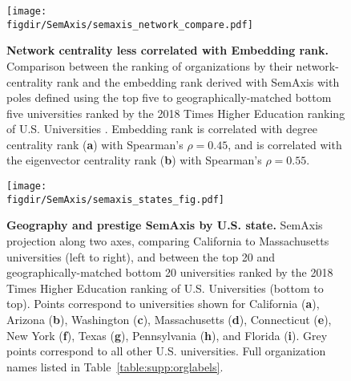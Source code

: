 \documentclass[12pt]{article} %
\def\figdir{../Figs}
\begin{document}
%
%
\begin{figure}[hp!]
	\centering
	\texttt{[image: \\figdir/SemAxis/semaxis\_network\_compare.pdf]}
	\caption{
		\textbf{Network centrality less correlated with Embedding rank.}
		Comparison between the ranking of organizations by their network-centrality rank and the embedding rank derived with SemAxis with poles defined using the top five to geographically-matched bottom five universities ranked by the 2018 Times Higher Education ranking of U.S. Universities .
		Embedding rank is correlated with degree centrality rank (\textbf{a}) with Spearman's $\rho = 0.45$, and is correlated with the eigenvector centrality rank (\textbf{b}) with Spearman's $\rho = 0.55$.
	}
	\label{fig:supp:centrality_semaxis_compare}
\end{figure}


%
%
\begin{figure}[hp!]
	\centering
	\texttt{[image: \\figdir/SemAxis/semaxis\_states\_fig.pdf]}
	\caption{
		\textbf{Geography and prestige SemAxis by U.S. state.}
		SemAxis projection along two axes, comparing California to Massachusetts universities (left to right), and between the top 20 and geographically-matched bottom 20 universities ranked by the 2018 Times Higher Education ranking of U.S. Universities (bottom to top).
		Points correspond to universities shown for California (\textbf{a}), Arizona (\textbf{b}), Washington (\textbf{c}), Massachusetts (\textbf{d}), Connecticut (\textbf{e}), New York (\textbf{f}), Texas (\textbf{g}), Pennsylvania (\textbf{h}), and Florida (\textbf{i}).
		Grey points correspond to all other U.S. universities.
		Full organization names listed in Table~\ref{table:supp:orglabels}.
	}
	\label{fig:supp:semaxis_states}
\end{figure}
\end{document}

